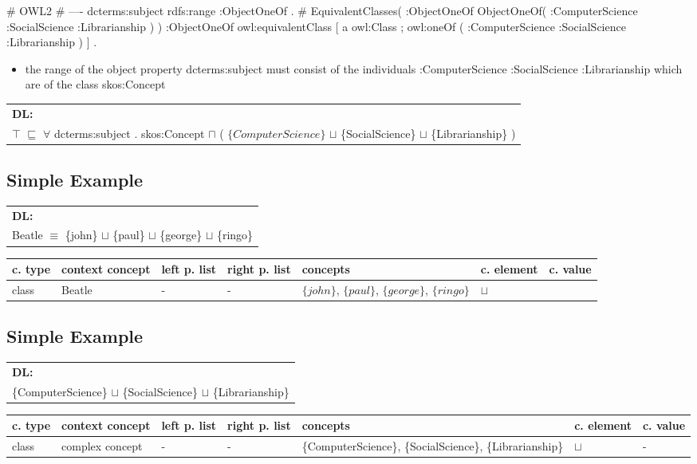 \documentclass{llncs}
\newenvironment{gcotable}{
  \scriptsize
  \sffamily
  \vspace{0.3cm}
  \begin{tabular}{l|l|l|l|l|l|l}
  \hline
  \textbf{c. type} & \textbf{context concept} & \textbf{left p. list} & \textbf{right p. list} & \textbf{concepts} & \textbf{c. element} & \textbf{c. value} \\
  \hline

}{
  \hline
  \end{tabular}
  \linebreak
}
\newenvironment{DL}{
  \scriptsize
  \sffamily
  \vspace{0.3cm}
  \begin{tabular}{l}
	\textbf{DL:} \\

}{
  \end{tabular}
  \linebreak
}
\begin{document}
\begin{ex}
# OWL2
# ----
dcterms:subject rdfs:range :ObjectOneOf . 
# EquivalentClasses( :ObjectOneOf ObjectOneOf( :ComputerScience :SocialScience :Librarianship ) )
:ObjectOneOf owl:equivalentClass [ 
    a owl:Class ;
    owl:oneOf ( :ComputerScience :SocialScience :Librarianship ) ] .
\end{ex}

\begin{itemize}
	\item the range of the object property dcterms:subject must consist of the individuals :ComputerScience :SocialScience :Librarianship which are of the class skos:Concept
\end{itemize}

\begin{DL}
$\top$ $\sqsubseteq$ $\forall$ dcterms:subject . skos:Concept $\sqcap$ ( $\{ComputerScience\}$ $\sqcup$ \{SocialScience\} $\sqcup$ \{Librarianship\} ) \\
\end{DL}

\subsection{Simple Example}

\begin{DL}
Beatle $\equiv$ \{john\} $\sqcup$ \{paul\} $\sqcup$ \{george\} $\sqcup$ \{ringo\} \\
\end{DL}

\begin{gcotable}
class & Beatle & - & - & $\{john\}$, $\{paul\}$, $\{george\}$, $\{ringo\}$ & $\sqcup$ \\
\end{gcotable}

\subsection{Simple Example}

\begin{DL}
\{ComputerScience\} $\sqcup$ \{SocialScience\} $\sqcup$ \{Librarianship\} \\
\end{DL}

\begin{gcotable}
class & complex concept & - & - & \{ComputerScience\}, \{SocialScience\}, \{Librarianship\} & $\sqcup$ & - \\
\end{gcotable}
\end{document}

